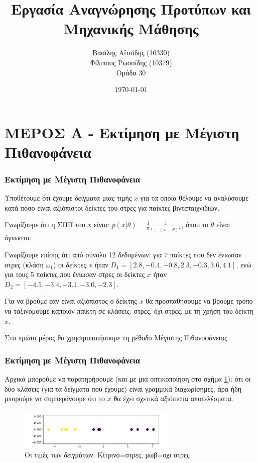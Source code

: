 \documentclass{beamer}
\title[Ομάδα 30] 
{Εργασία Αναγνώρησης Προτύπων και Μηχανικής Μάθησης}
\author[Βασίλης Αϊτσίδης, Φίλιππος Ρωσσίδης]
{Βασίλης Αϊτσίδης (10330) \\ Φίλιππος Ρωσσίδης (10379) \\ Ομάδα 30}
\institute{ΑΠΘ}
\date{\today}
\begin{document}
\frame{\titlepage}


\section{ΜΕΡΟΣ Α - Εκτίμηση με Μέγιστη Πιθανοφάνεια}

\begin{frame}
\frametitle{Εκτίμηση με Μέγιστη Πιθανοφάνεια}

Υποθέτουμε ότι έχουμε δείγματα μιας τιμής $x$ για τα οποία θέλουμε να
αναλύσουμε κατά πόσο είναι αξιόπιστοι δείκτες του στρες για παίκτες βιντεπαιχνιδιών.

Γνωρίζουμε ότι η ΣΠΠ του $x$ είναι: 
$p(x|\theta) = \frac{1}{\pi} \frac{1}{1+(x-\theta)^2}$, όπου το $\theta$ 
είναι άγνωστο. 

Γνωρίζουμε επίσης ότι από σύνολο 12 δεδομένων: για 7 παίκτες που δεν ένιωσαν στρες (κλάση $\omega_1$)
οι δείκτες $x$ ήταν $D_1=[ 2.8, -0.4, -0.8, 2.3,-0.3,3.6,4.1]$, ενώ για τους 5 παίκτες
που ένιωσαν στρες 
οι δείκτες $x$ ήταν $D_2=[-4.5,-3.4,-3.1,-3.0,-2.3]$. 


Για να βρούμε εάν είναι αξιόπιστος ο δείκτης $x$ θα προσπαθήσουμε να βρούμε τρόπο
να ταξινομούμε κάποιον παίκτη σε κλάσεις: στρες, όχι στρες, με τη χρήση του 
δείκτη $x$. 

Στο πρώτο μέρος θα χρησιμοποιήσουμε τη μέθοδο Μέγιστης Πιθανοφάνειας.

\end{frame}



\begin{frame}
\frametitle{Εκτίμηση με Μέγιστη Πιθανοφάνεια}

Αρχικά μπορούμε να παρατηρήσουμε (και με μια οπτικοποίηση στο σχήμα \ref{fig:1}): ότι 
οι δύο κλάσεις (για τα δείγματα που έχουμε) είναι γραμμικά διαχωρίσημες, άρα 
ήδη μπορούμε να συμπεράνουμε ότι το $x$ θα έχει σχετικά αξιόπιστα αποτελέσματα.

\begin{figure}
    \centering
        \includegraphics[width=0.7\textwidth]{./plots/Figure_1.pdf}
        \caption{Οι τιμές των δειγμάτων. Κίτρινο=στρες, μωβ=οχι στρες}
        \label{fig:1}
\end{figure}



\end{frame}
\end{document}
